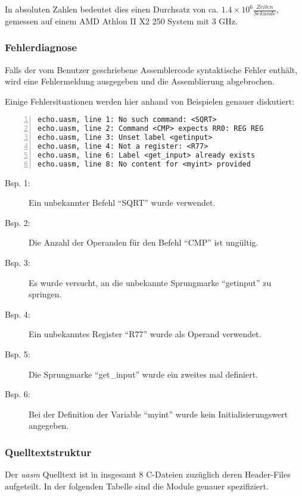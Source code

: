 In absoluten Zahlen bedeutet dies einen Durchsatz von ca.
$1.4 \times 10^6 \frac{Zeilen}{Sekunde}$, gemessen auf einem
AMD Athlon II X2 250 System mit 3 GHz.

\subsubsection{Fehlerdiagnose}

Falls der vom Benutzer geschriebene Assemblercode syntaktische Fehler enthält,
wird eine Fehlermeldung ausgegeben und die Assemblierung abgebrochen.

Einige Fehlersituationen werden hier anhand von Beispielen genauer diskutiert:
\begin{lstlisting}[numbers=left, numberstyle=\tiny]
echo.uasm, line 1: No such command: <SQRT>
echo.uasm, line 2: Command <CMP> expects RR0: REG REG
echo.uasm, line 3: Unset label <getinput>
echo.uasm, line 4: Not a register: <R77>
echo.uasm, line 6: Label <get_input> already exists
echo.uasm, line 8: No content for <myint> provided
\end{lstlisting}

\begin{description}
    \item[Bsp. 1:] Ein unbekannter Befehl ``SQRT'' wurde verwendet.
    \item[Bsp. 2:] Die Anzahl der Operanden für den Befehl ``CMP'' ist ungültig.
    \item[Bsp. 3:] Es wurde versucht, an die unbekannte Sprungmarke ``getinput''
                   zu springen.
    \item[Bsp. 4:] Ein unbekanntes Register ``R77'' wurde als Operand verwendet.
    \item[Bsp. 5:] Die Sprungmarke ``get\_input'' wurde ein zweites mal
                   definiert.
    \item[Bsp. 6:] Bei der Definition der Variable ``myint'' wurde kein
                   Initialisierungswert angegeben.
\end{description}

\subsubsection{Quelltextstruktur}

Der \emph{uasm} Quelltext ist in insgesamt 8 C-Dateien zuzüglich deren
Header-Files aufgeteilt. In der folgenden Tabelle sind die Module genauer
spezifiziert.

